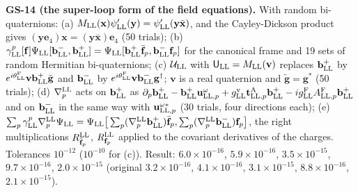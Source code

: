 \documentclass[
  10pt,
]{article}
\begin{document}
\textbf{GS-14 (the super-loop form of the field equations).} With random
bi-quaternions: (a)
\(M_{\rm LL}(\mathbf x)\psi'_{\rm LL}(\mathbf y)=\psi'_{\rm LL}(\mathbf y\bar{\mathbf x})\),
and the Cayley-Dickson product gives
\((\mathbf y\mathbf e_4)\mathbf x=(\mathbf y\bar{\mathbf x})\mathbf e_4\)
(50 trials); (b)
\(\gamma^p_{\rm LL}[\mathbf f]\Psi_{\rm LL}[\mathbf b^-_{\rm LL},\mathbf b^+_{\rm LL}]=\Psi_{\rm LL}[\mathbf b^+_{\rm LL}\bar{\mathbf f}_p,\mathbf b^-_{\rm LL}\mathbf f_p]\)
for the canonical frame and 19 sets of random Hermitian bi-quaternions;
(c) \(\mathcal U_{\rm LL}\) with
\(\mathsf U_{\rm LL}=M_{\rm LL}(\mathbf v)\) replaces
\(\mathbf b^+_{\rm LL}\) by
\(e^{i\theta^{\rm F}_{\rm LL}}\mathbf v\mathbf b^+_{\rm LL}\bar{\mathbf g}\)
and \(\mathbf b^-_{\rm LL}\) by
\(e^{i\theta^{\rm F}_{\rm LL}}\mathbf v\mathbf b^-_{\rm LL}\mathbf g^\dagger\);
\(\mathbf v\) is a real quaternion and \(\tilde{\mathbf g}=\mathbf g^*\)
(50 trials); (d) \(\nabla^{\rm LL}_p\) acts on \(\mathbf b^+_{\rm LL}\)
as
\(\partial_p\mathbf b^+_{\rm LL}-\mathbf b^+_{\rm LL}\mathbf u^\omega_{{\rm LL},p}+g^{\rm v}_{\rm LL}\mathbf t^{\rm A}_{{\rm LL},p}\mathbf b^+_{\rm LL}-ig^{\rm F}_{\rm LL}A^{\rm F}_{{\rm LL},p}\mathbf b^+_{\rm LL}\)
and on \(\mathbf b^-_{\rm LL}\) in the same way with
\(\mathbf u^{\omega*}_{{\rm LL},p}\) (30 trials, four directions each);
(e)
\(\sum_p\gamma^p_{\rm LL}\nabla^{\rm LL}_p\Psi_{\rm LL}=\Psi_{\rm LL}\big[\sum_p(\nabla^{\rm LL}_p\mathbf b^+_{\rm LL})\bar{\mathbf f}_p,\sum_p(\nabla^{\rm LL}_p\mathbf b^-_{\rm LL})\mathbf f_p\big]\),
the right multiplications \(R^{\rm LL}_{\bar{\mathbf f}_p}\),
\(R^{\rm LL}_{\mathbf f_p}\) applied to the covariant derivatives of the
charges. Tolerances \(10^{-12}\) (\(10^{-10}\) for (c)). Result:
\(6.0\times10^{-16}\), \(5.9\times10^{-16}\), \(3.5\times10^{-15}\),
\(9.7\times10^{-16}\), \(2.0\times10^{-15}\) (original
\(3.2\times10^{-16}\), \(4.1\times10^{-16}\), \(3.1\times10^{-15}\),
\(8.8\times10^{-16}\), \(2.1\times10^{-15}\)).
\end{document}
